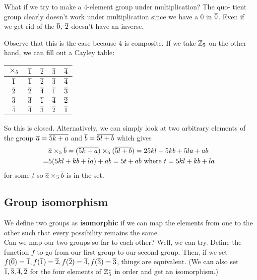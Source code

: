 What if we try to make a 4-element group under multiplication? The quo-
tient group clearly doesn't work under multiplication since we have a 0 in
$\overline{0}$. Even if we get rid of the $\overline{0}$, $\overline{2}$ doesn't have an inverse.

Observe that this is the case because 4 is composite. If we take $\mathbb{Z}_5$ on the other hand, we
can ﬁll out a Cayley table:
\begin{center}
    \begin{tabular}{|c|c|c|c|c|}
        \hline 
        $\times_5$ & $\overline{1}$ & $\overline{2}$ & $\overline{3}$ & $\overline{4}$ \\ \hline 
        $\overline{1}$ & $\overline{1}$ & $\overline{2}$ & $\overline{3}$ & $\overline{4}$ \\ \hline 
        $\overline{2}$ & $\overline{2}$ & $\overline{4}$ & $\overline{1}$ & $\overline{3}$ \\ \hline 
        $\overline{3}$ & $\overline{3}$ & $\overline{1}$ & $\overline{4}$ & $\overline{2}$ \\ \hline 
        $\overline{4}$ & $\overline{4}$ & $\overline{3}$ & $\overline{2}$ & $\overline{1}$ \\ \hline 
    \end{tabular}
\end{center}
So this is closed. Alternatively, we can simply look at two arbitrary elements of the group
$\overline{a} = \overline{5k+a}$ and $\overline{b} = \overline{5l+b}$ which gives 
\begin{align*}
    &\overline{a} \times_5 \overline{b} = (\overline{5k + a}) \times_5 (\overline{5l+b})  = 25kl + 5kb + 5la + ab\\
    =&5(5kl + kb + la) + ab = 5t + ab \text{ where } t = 5kl + kb + la
\end{align*}
for some $t$ so $\overline{a} \times_5 \overline{b}$ is in the set. 

\subsection{Group isomorphism}
We deﬁne two groups as \textbf{isomorphic} if we can map the elements from one
to the other such that every possibility remains the same.\\ 

Can we map our two groups so far to each other? Well, we can try. Deﬁne
the function $f$ to go from our ﬁrst group to our second group. Then, if we
set $f(\overline{0}) = \overline{1}, f(\overline{1}) = \overline{2}, f(\overline{2}) = \overline{4}, f(\overline{3}) = \overline{3}$, things are equivalent. (We can
also set $\overline{1}, \overline{3}, \overline{4}, \overline{2}$ for the four elements of $\mathbb{Z}_5^*$ in order and get an isomorphism.)\\ 

